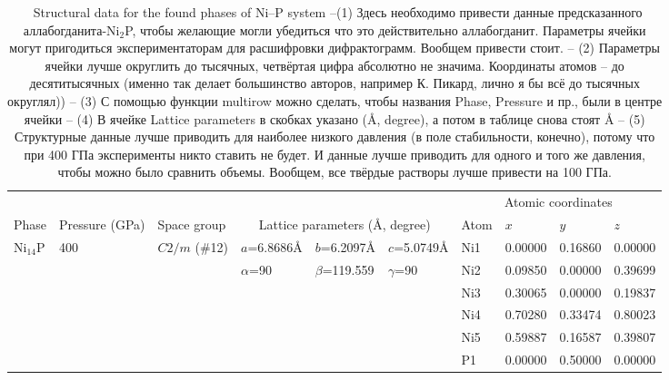\documentclass[twoside,twocolumn,9pt]{article}
\begin{document}
\begin{table}[t]
\small
  \caption{\ Structural data for the found phases of Ni--P system 
{\color{red}–(1) Здесь необходимо привести данные предсказанного аллабогданита-Ni$_2$P, чтобы желающие могли убедиться что это действительно аллабогданит. Параметры ячейки могут пригодиться экспериментаторам для расшифровки дифрактограмм. Вообщем привести стоит.
– (2) Параметры ячейки лучше округлить до тысячных, четвёртая цифра абсолютно не значима. Координаты атомов – до десятитысячных (именно так делает большинство авторов, например К. Пикард, лично я бы всё до тысячных округлял))
– (3) С помощью функции multirow можно сделать, чтобы названия Phase, Pressure и пр., были в центре ячейки
– (4) В ячейке Lattice parameters в скобках указано (\AA, degree), а потом в таблице снова стоят \AA 
– (5) Структурные данные лучше приводить для наиболее низкого давления (в поле стабильности, конечно), потому что при 400 ГПа эксперименты никто ставить не будет. И данные лучше приводить для одного и того же давления, чтобы можно было сравнить объемы. Вообщем, все твёрдые растворы лучше привести на 100 ГПа.}
}
  \label{tbl:new_phases}
  \begin{tabular*}{\textwidth}{@{\extracolsep{\fill}}llllllllll}
    \hline
    \multicolumn{6}{l}{} & \multicolumn{4}{c}{Atomic coordinates}\\\cline{7-10}
    Phase & Pressure (GPa) & Space group & \multicolumn{3}{c}{Lattice parameters (\AA, degree)}  & Atom & $x$ & $y$ & $z$\\
    \midrule
    Ni$_{14}$P & 400 & $C2/m$ (\#12) & $a$=6.8686\AA    & $b$=6.2097\AA   & $c$=5.0749\AA    & Ni1 & 0.00000 & 0.16860 & 0.00000 \\
               &     &               & $\alpha$=90      & $\beta$=119.559 & $\gamma$=90      & Ni2 & 0.09850 & 0.00000 & 0.39699 \\    
               &     &               &                  &                 &                  & Ni3 & 0.30065 & 0.00000 & 0.19837 \\
               &     &               &                  &                 &                  & Ni4 & 0.70280 & 0.33474 & 0.80023 \\
               &     &               &                  &                 &                  & Ni5 & 0.59887 & 0.16587 & 0.39807 \\
               &     &               &                  &                 &                  & P1  & 0.00000 & 0.50000 & 0.00000 \\

\end{tabular*}
\end{table}
\end{document}
